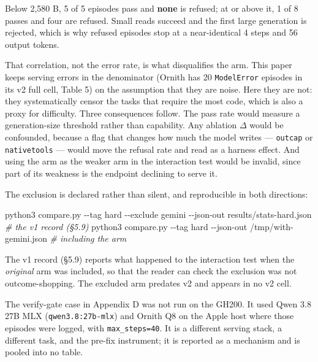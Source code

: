 \documentclass[
  10pt,
  a4paper,
]{article}
\newenvironment{Shaded}{}{}
\newcommand{\AttributeTok}[1]{\textcolor[rgb]{0.49,0.56,0.16}{#1}}
\newcommand{\CommentTok}[1]{\textcolor[rgb]{0.38,0.63,0.69}{\textit{#1}}}
\newcommand{\ExtensionTok}[1]{#1}
\newcommand{\NormalTok}[1]{#1}
\newcounter{none} %
\let\oldtexttt\texttt
\renewcommand{\texttt}[1]{{\small\oldtexttt{#1}}}
\begin{document}
Below 2,580 B, 5 of 5 episodes pass and \textbf{none} is refused; at or
above it, 1 of 8 passes and four are refused. Small reads succeed and
the first large generation is rejected, which is why refused episodes
stop at a near-identical 4 steps and 56 output tokens.

That correlation, not the error rate, is what disqualifies the arm. This
paper keeps serving errors in the denominator (Ornith has 20
\texttt{ModelError} episodes in its v2 full cell, Table 5) on the
assumption that they are noise. Here they are not: they systematically
censor the tasks that require the most code, which is also a proxy for
difficulty. Three consequences follow. The pass rate would measure a
generation-size threshold rather than capability. Any ablation
\(\Delta\) would be confounded, because a flag that changes how much the
model writes --- \texttt{outcap} or \texttt{nativetools} --- would move
the refusal rate and read as a harness effect. And using the arm as the
weaker arm in the interaction test would be invalid, since part of its
weakness is the endpoint declining to serve it.

The exclusion is declared rather than silent, and reproducible in both
directions:

\begin{Shaded}
\begin{Highlighting}[]
\ExtensionTok{python3}\NormalTok{ compare.py }\AttributeTok{{-}{-}tag}\NormalTok{ hard }\AttributeTok{{-}{-}exclude}\NormalTok{ gemini }\AttributeTok{{-}{-}json{-}out}\NormalTok{ results/stats{-}hard.json   }\CommentTok{\# the v1 record (§5.9)}
\ExtensionTok{python3}\NormalTok{ compare.py }\AttributeTok{{-}{-}tag}\NormalTok{ hard }\AttributeTok{{-}{-}json{-}out}\NormalTok{ /tmp/with{-}gemini.json                      }\CommentTok{\# including the arm}
\end{Highlighting}
\end{Shaded}

The v1 record (§5.9) reports what happened to the interaction test when
the \emph{original} arm was included, so that the reader can check the
exclusion was not outcome-shopping. The excluded arm predates v2 and
appears in no v2 cell.

The verify-gate case in Appendix D was not run on the GH200. It used
Qwen 3.8 27B MLX (\texttt{qwen3.8:27b-mlx}) and Ornith Q8 on the Apple
host where those episodes were logged, with \texttt{max\_steps=40}. It
is a different serving stack, a different task, and the pre-fix
instrument; it is reported as a mechanism and is pooled into no table.
\end{document}
